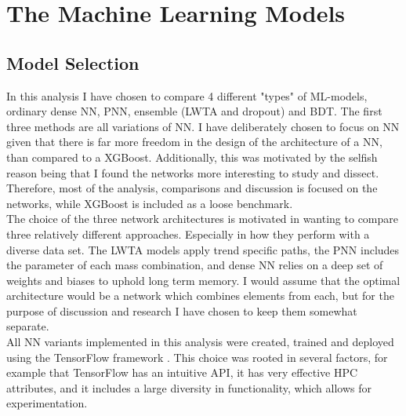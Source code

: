 \section{The Machine Learning Models}
\subsection{Model Selection}
In this analysis I have chosen to compare 4 different "types" of \ac{ML}-models, ordinary dense \acf{NN}, \acf{PNN},
ensemble (\ac{LWTA} and dropout) and \acf{BDT}. The first three methods are all variations of \ac{NN}. I have deliberately 
chosen to focus on \ac{NN} given that there is far more freedom in the design of the architecture
of a \ac{NN}, than compared to a XGBoost. Additionally, this was motivated by the selfish reason
being that I found the networks more interesting to study and dissect. Therefore, most of the 
analysis, comparisons and discussion is focused on the networks, while XGBoost is included 
as a loose benchmark. 
\\
The choice of the three network architectures is motivated in wanting to compare three relatively different approaches.
Especially in how they perform with a diverse data set. The \ac{LWTA} models apply trend specific paths, the \ac{PNN} includes 
the parameter of each mass combination, and dense \ac{NN} relies on a deep set of weights and biases to uphold long term memory.
I would assume that the optimal architecture would be a network which combines elements from each, but for the purpose of discussion
and research I have chosen to keep them somewhat separate. 
\\
All \ac{NN} variants implemented in this analysis were created, trained and deployed using the TensorFlow framework \cite{tensorflow}.
This choice was rooted in several factors, for example that TensorFlow has an intuitive \ac{API}, it has very effective
\ac{HPC} attributes, and it includes a large diversity in functionality, which allows for experimentation.
